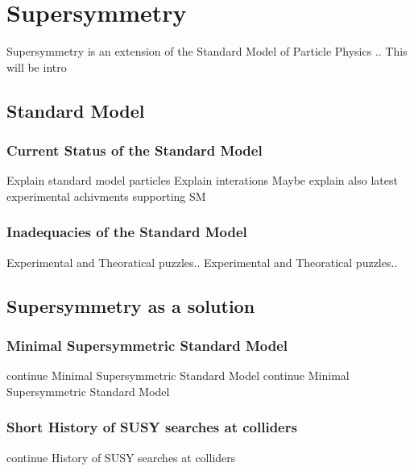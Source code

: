 \chapter{Supersymmetry}
Supersymmetry is an extension of the Standard Model of Particle Physics ..
This will be intro
\newpage
\section{Standard Model}
\label{sec:StandardModel}
\newpage
\subsection{Current Status of the Standard Model}
Explain standard model particles
\newpage
Explain interations
\newpage
Maybe explain also latest experimental achivments supporting SM
\newpage
\subsection{Inadequacies of the Standard Model}
Experimental and Theoratical puzzles..
\newpage
Experimental and Theoratical puzzles..
\newpage
\section{Supersymmetry as a solution}
\newpage
\subsection{Minimal Supersymmetric Standard Model}
\newpage
continue Minimal Supersymmetric Standard Model
\newpage
continue Minimal Supersymmetric Standard Model
\newpage
\subsection{Short History of SUSY searches at colliders}
\newpage
continue History of SUSY searches at colliders
\newpage


